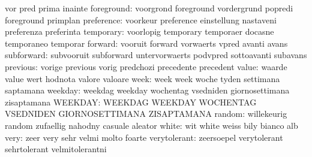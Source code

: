                            vor                       pred
                           prima                     inainte
               foreground: voorgrond                 foreground
                           vordergrund               popredi
                           foreground                primplan
               preference: voorkeur                  preference
                           einstellung               nastaveni
                           preferenza                preferinta
                temporary: voorlopig                 temporary
                           temporaer                 docasne
                           temporaneo                temporar
                  forward: vooruit                   forward
                           vorwaerts                 vpred
                           avanti                    avans
               subforward: subvooruit                subforward
                           untervorwaerts            podvpred
                           sottoavanti               subavans
                 previous: vorige                    previous
                           vorig                     predchozi
                           precedente                precedent
                    value: waarde                    value
                           wert                      hodnota
                           valore                    valoare
                     week: week                      week
                           woche                     tyden
                           settimana                 saptamana
                  weekday: weekdag                   weekday
                           wochentag                 vsedniden
                           giornosettimana           zisaptamana
                  WEEKDAY: WEEKDAG                   WEEKDAY
                           WOCHENTAG                 VSEDNIDEN
                           GIORNOSETTIMANA           ZISAPTAMANA
                   random: willekeurig               random
                           zufaellig                 nahodny
                           casuale                   aleator
                    white: wit                       white
                           weiss                     bily
                           bianco                    alb
                     very: zeer                      very
                           sehr                      velmi
                           molto                     foarte
             verytolerant: zeersoepel                verytolerant
                           sehrtolerant              velmitolerantni
